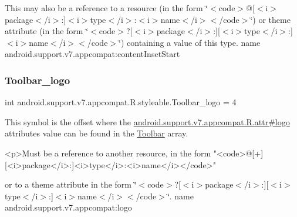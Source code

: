 This may also be a reference to a resource (in the form \char`\"{}$<$code$>$@\mbox{[}$<$i$>$package$<$/i$>$\+:\mbox{]}$<$i$>$type$<$/i$>$\+:$<$i$>$name$<$/i$>$$<$/code$>$\char`\"{}) or theme attribute (in the form \char`\"{}$<$code$>$?\mbox{[}$<$i$>$package$<$/i$>$\+:\mbox{]}\mbox{[}$<$i$>$type$<$/i$>$\+:\mbox{]}$<$i$>$name$<$/i$>$$<$/code$>$\char`\"{}) containing a value of this type.  name android.\+support.\+v7.\+appcompat\+:content\+Inset\+Start \mbox{\label{classandroid_1_1support_1_1v7_1_1appcompat_1_1R_1_1styleable_ad17c84854643ce15da5744493c1e7f28}} 
\subsubsection{\texorpdfstring{Toolbar\+\_\+logo}{Toolbar\_logo}}
{\footnotesize\ttfamily int android.\+support.\+v7.\+appcompat.\+R.\+styleable.\+Toolbar\+\_\+logo = 4\hspace{0.3cm}{\ttfamily [static]}}

This symbol is the offset where the \hyperlink{classandroid_1_1support_1_1v7_1_1appcompat_1_1R_1_1attr_a112ee2368699d6914bca0aa5ac9bb096}{android.\+support.\+v7.\+appcompat.\+R.\+attr\#logo} attribute\textquotesingle{}s value can be found in the \hyperlink{classandroid_1_1support_1_1v7_1_1appcompat_1_1R_1_1styleable_a2daba9587ef9f700f2d54cf13435cb32}{Toolbar} array.

\begin{DoxyVerb}      <p>Must be a reference to another resource, in the form "<code>@[+][<i>package</i>:]<i>type</i>:<i>name</i></code>"
\end{DoxyVerb}
 or to a theme attribute in the form \char`\"{}$<$code$>$?\mbox{[}$<$i$>$package$<$/i$>$\+:\mbox{]}\mbox{[}$<$i$>$type$<$/i$>$\+:\mbox{]}$<$i$>$name$<$/i$>$$<$/code$>$\char`\"{}.  name android.\+support.\+v7.\+appcompat\+:logo \mbox{\label{classandroid_1_1support_1_1v7_1_1appcompat_1_1R_1_1styleable_a0b18e2d1f2ae0e17ea6c1c72fbee6ad1}} 
